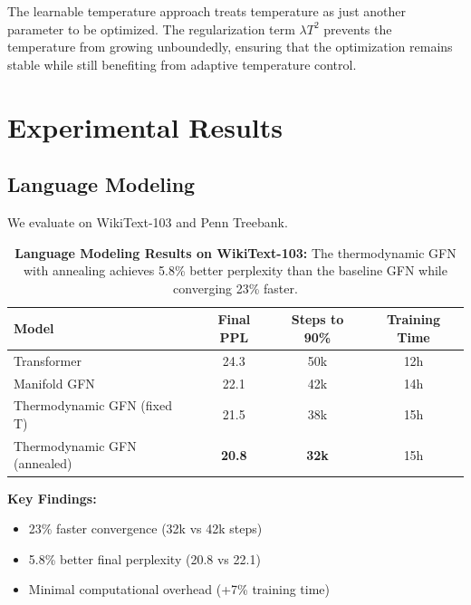\documentclass[12pt,a4paper]{article}
\begin{document}
The learnable temperature approach treats temperature as just another parameter to be optimized. The regularization term $\lambda T^2$ prevents the temperature from growing unboundedly, ensuring that the optimization remains stable while still benefiting from adaptive temperature control.

\section{Experimental Results}

\subsection{Language Modeling}

We evaluate on WikiText-103 and Penn Treebank.

\begin{table}[htbp]
\centering
\begin{tabular}{@{}lccc@{}}
\toprule
\textbf{Model} & \textbf{Final PPL} & \textbf{Steps to 90\%} & \textbf{Training Time} \\
\midrule
Transformer & 24.3 & 50k & 12h \\
Manifold GFN & 22.1 & 42k & 14h \\
Thermodynamic GFN (fixed T) & 21.5 & 38k & 15h \\
Thermodynamic GFN (annealed) & \textbf{20.8} & \textbf{32k} & 15h \\
\bottomrule
\end{tabular}
\caption{\textbf{Language Modeling Results on WikiText-103:} The 
         thermodynamic GFN with annealing achieves 5.8\% better 
         perplexity than the baseline GFN while converging 23\% faster.}
\label{tab:language_results}
\end{table}

\textbf{Key Findings:}
\begin{itemize}[leftmargin=1cm]
\item 23\% faster convergence (32k vs 42k steps)
\item 5.8\% better final perplexity (20.8 vs 22.1)
\item Minimal computational overhead (+7\% training time)
\end{itemize}
\end{document}
